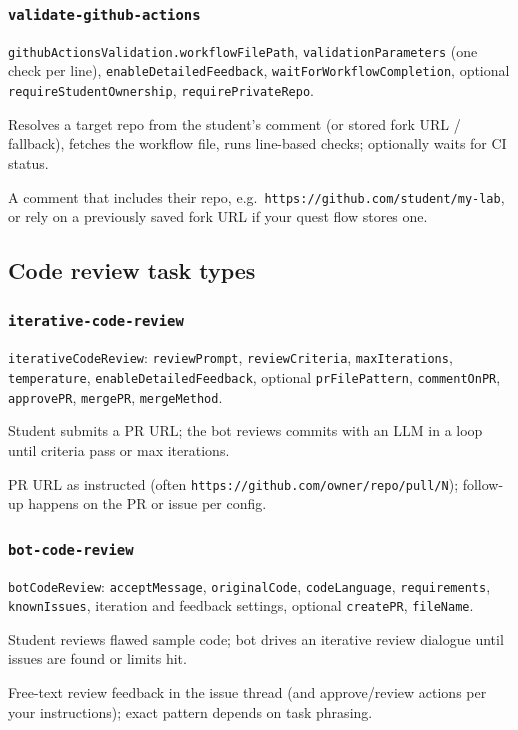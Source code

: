 \documentclass[11pt,a4paper]{article}
\newcommand{\field}[1]{\texttt{#1}}
\newcommand{\subtype}[1]{\subsubsection*{#1}}
\begin{document}
\subtype{\texttt{validate-github-actions}}
\begin{description}[style=nextline,leftmargin=0cm]
  \item[Fields] \texttt{githubActionsValidation.\field{workflowFilePath}}, \field{validationParameters} (one check per line), \field{enableDetailedFeedback}, \field{waitForWorkflowCompletion}, optional \field{requireStudentOwnership}, \field{requirePrivateRepo}.
  \item[Why / use] Resolves a target repo from the student's comment (or stored fork URL / fallback), fetches the workflow file, runs line-based checks; optionally waits for CI status.
  \item[Student should post] A comment that includes their repo, e.g.\ \texttt{https://github.com/student/my-lab}, or rely on a previously saved fork URL if your quest flow stores one.
\end{description}

\subsection{Code review task types}

\subtype{\texttt{iterative-code-review}}
\begin{description}[style=nextline,leftmargin=0cm]
  \item[Fields] \texttt{iterativeCodeReview}: \field{reviewPrompt}, \field{reviewCriteria}, \field{maxIterations}, \field{temperature}, \field{enableDetailedFeedback}, optional \field{prFilePattern}, \field{commentOnPR}, \field{approvePR}, \field{mergePR}, \field{mergeMethod}.
  \item[Why / use] Student submits a PR URL; the bot reviews commits with an LLM in a loop until criteria pass or max iterations.
  \item[Student should post] PR URL as instructed (often \texttt{https://github.com/owner/repo/pull/N}); follow-up happens on the PR or issue per config.
\end{description}

\subtype{\texttt{bot-code-review}}
\begin{description}[style=nextline,leftmargin=0cm]
  \item[Fields] \texttt{botCodeReview}: \field{acceptMessage}, \field{originalCode}, \field{codeLanguage}, \field{requirements}, \field{knownIssues}, iteration and feedback settings, optional \field{createPR}, \field{fileName}.
  \item[Why / use] Student reviews flawed sample code; bot drives an iterative review dialogue until issues are found or limits hit.
  \item[Student should post] Free-text review feedback in the issue thread (and approve/review actions per your instructions); exact pattern depends on task phrasing.
\end{description}
\end{document}
